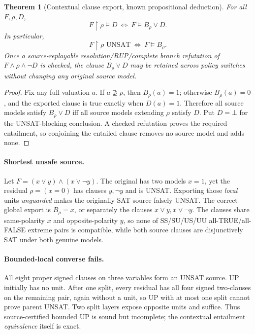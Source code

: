 \documentclass[11pt]{article}
\newtheorem{theorem}{Theorem}
\begin{document}
\begin{theorem}[Contextual clause export, known propositional deduction]
For all \(F,\rho,D\),
\[
\boxed{F\upharpoonright\rho\models D\ \Longleftrightarrow\ F\models B_\rho\vee D.}
\]
In particular,
\[
\boxed{F\upharpoonright\rho\text{ UNSAT}\ \Longleftrightarrow\ F\models B_\rho.}
\]
Once a source-replayable resolution/RUP/complete branch refutation of \(F\wedge\rho\wedge\neg D\) is checked, the clause \(B_\rho\vee D\) may be retained across policy switches without changing \emph{any original source model}.
\end{theorem}
\begin{proof}
Fix any full valuation \(a\). If \(a\not\supseteq\rho\), then \(B_\rho(a)=1\); otherwise \(B_\rho(a)=0\), and the exported clause is true exactly when \(D(a)=1\). Therefore all source models satisfy \(B_\rho\vee D\) iff all source models extending \(\rho\) satisfy \(D\). Put \(D=\bot\) for the UNSAT-blocking conclusion. A checked refutation proves the required entailment, so conjoining the entailed clause removes no source model and adds none.
\end{proof}

\paragraph{Shortest unsafe source.}
Let \(F=(x\vee y)\wedge(x\vee\neg y)\). The original has two models \(x=1\), yet the residual \(\rho=(x=0)\) has clauses \(y,\neg y\) and is UNSAT. Exporting those \emph{local} units \emph{unguarded} makes the originally SAT source falsely UNSAT. The correct global export is \(B_\rho=x\), or separately the clauses \(x\vee y,x\vee\neg y\). The clauses share same-polarity \(x\) and opposite-polarity \(y\), so none of SS/SU/US/UU all-TRUE/all-FALSE extreme pairs is compatible, while both source clauses are disjunctively SAT under both genuine models.

\paragraph{Bounded-local converse fails.}
All eight proper signed clauses on three variables form an UNSAT source. UP initially has no unit. After one split, every residual has all four signed two-clauses on the remaining pair, again without a unit, so UP with at most one split cannot prove parent UNSAT. Two split layers expose opposite units and suffice. Thus source-certified bounded UP is sound but incomplete; the contextual entailment \emph{equivalence} itself is exact.
\end{document}
